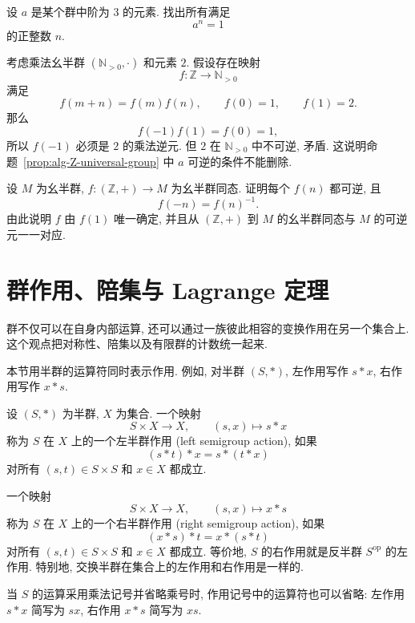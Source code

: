 \documentclass[usesamecnt, thmcnt=section, lang=cn, newtx, 10pt, scheme=chinese]{elegantbook}
\begin{document}
\begin{exercise}\label{ex:alg-order-minimality}
设 $a$ 是某个群中阶为 $3$ 的元素. 找出所有满足
\[
 a^n=1
\]
的正整数 $n$.
\end{exercise}

\begin{instance}
考虑乘法幺半群 $(\mathbb N_{>0},\cdot)$ 和元素 $2$. 假设存在映射
\[
 f:\mathbb Z\to\mathbb N_{>0}
\]
满足
\[
 f(m+n)=f(m)f(n),\qquad f(0)=1,\qquad f(1)=2.
\]
那么
\[
 f(-1)f(1)=f(0)=1,
\]
所以 $f(-1)$ 必须是 $2$ 的乘法逆元. 但 $2$ 在 $\mathbb N_{>0}$ 中不可逆, 矛盾. 这说明命题~\ref{prop:alg-Z-universal-group} 中 $a$ 可逆的条件不能删除.
\end{instance}

\begin{exercise}\label{ex:alg-Z-universal-invertible}
设 $M$ 为幺半群, $f:(\mathbb Z,+)\to M$ 为幺半群同态. 证明每个 $f(n)$ 都可逆, 且
\[
 f(-n)=f(n)^{-1}.
\]
由此说明 $f$ 由 $f(1)$ 唯一确定, 并且从 $(\mathbb Z,+)$ 到 $M$ 的幺半群同态与 $M$ 的可逆元一一对应.
\end{exercise}

\section{群作用、陪集与 Lagrange 定理}

群不仅可以在自身内部运算, 还可以通过一族彼此相容的变换作用在另一个集合上. 这个观点把对称性、陪集以及有限群的计数统一起来.

本节用半群的运算符同时表示作用. 例如, 对半群 $(S,*)$, 左作用写作 $s*x$, 右作用写作 $x*s$.

\begin{definition}[半群的左作用与右作用]\label{def:alg-semigroup-action}
设 $(S,*)$ 为半群, $X$ 为集合. 一个映射
\[
 S\times X\longrightarrow X,
 \qquad
 (s,x)\longmapsto s*x
\]
称为 $S$ 在 $X$ 上的一个{\color{blue}左半群作用 (left semigroup action)}, 如果
\[
 (s*t)*x=s*(t*x)
\]
对所有 $(s,t)\in S\times S$ 和 $x\in X$ 都成立.

一个映射
\[
 S\times X\longrightarrow X,
 \qquad
 (s,x)\longmapsto x*s
\]
称为 $S$ 在 $X$ 上的一个{\color{blue}右半群作用 (right semigroup action)}, 如果
\[
 (x*s)*t=x*(s*t)
\]
对所有 $(s,t)\in S\times S$ 和 $x\in X$ 都成立. 等价地, $S$ 的右作用就是反半群 $S^{\mathrm{op}}$ 的左作用. 特别地, 交换半群在集合上的左作用和右作用是一样的.

当 $S$ 的运算采用乘法记号并省略乘号时, 作用记号中的运算符也可以省略: 左作用 $s*x$ 简写为 $sx$, 右作用 $x*s$ 简写为 $xs$.
\end{definition}
\end{document}
